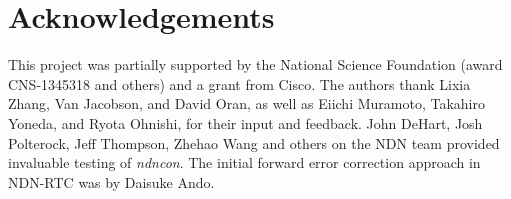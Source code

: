 \documentclass{icn/sig-alternate-2013} %
\newcommand{\ndnrtcName}{NDN-RTC} %
\newcommand{\ndnconName}{\emph{ndncon}}
\begin{document}
\section{Acknowledgements}
\label{sec:Acknowledgements}
This project was partially supported by the National Science Foundation (award CNS-1345318 and others) and a grant from Cisco. The authors thank Lixia Zhang, Van Jacobson, and David Oran, as well as Eiichi Muramoto, Takahiro Yoneda, and Ryota Ohnishi, for their input and feedback. John DeHart, Josh Polterock, Jeff Thompson, Zhehao Wang and others on the NDN team provided invaluable testing of \ndnconName{}.  The initial forward error correction approach in \ndnrtcName{} was by Daisuke Ando. 


{\small

}
\end{document}
